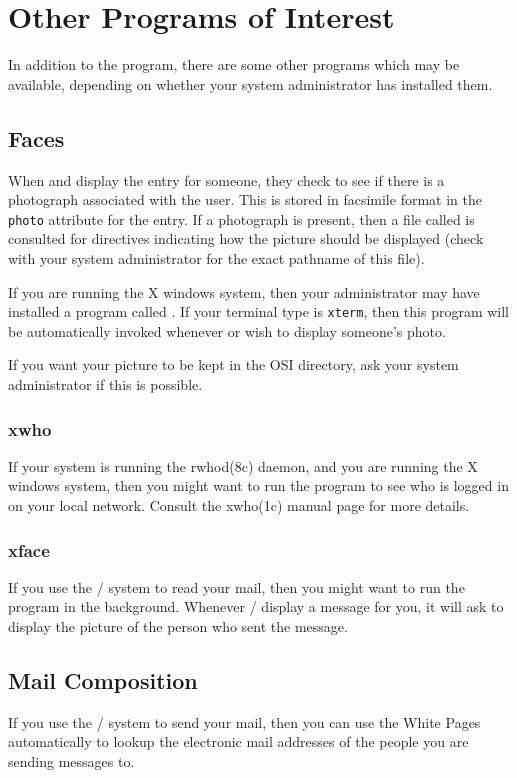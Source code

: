 
\chapter	{Other Programs of Interest}
In addition to the  program,
there are some other programs which may be available,
depending on whether your system administrator has installed them.

\section	{Faces}
When  and  display the entry for someone,
they check to see if there is a photograph associated with the user.
This is stored in facsimile format in the \verb"photo" attribute for the entry.
If a photograph is present,
then a file called  is consulted for directives
indicating how the picture should be displayed
(check with your system administrator for the exact pathname of this file).

If you are running the X windows system,
then your administrator may have installed a program called .
If your terminal type is \verb"xterm",
then this program will be automatically invoked whenever  or
 wish to display someone's photo.

If you want your picture to be kept in the OSI directory,
ask your system administrator if this is possible.

\subsection	{xwho}
If your system is running the \man rwhod(8c) daemon,
and you are running the X windows system,
then you might want to run the  program to see who is logged in on
your local network.
Consult the \man xwho(1c) manual page for more details.

\subsection	{xface}
If you use the \MH/ system to read your mail,
then you might want to run the  program in the background.
Whenever \MH/ display a message for you,
it will ask  to display the picture of the person who sent the
message.

\section	{Mail Composition}
If you use the \MH/ system to send your mail,
then you can use the White Pages automatically to lookup the electronic mail
addresses of the people you are sending messages to.

